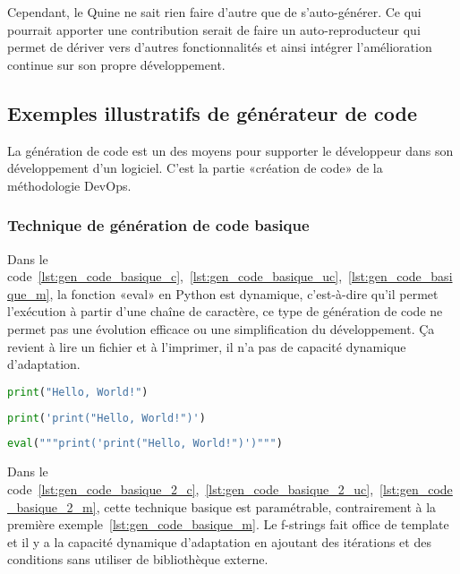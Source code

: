 Cependant, le Quine ne sait rien faire d’autre que de s’auto-générer. Ce qui pourrait apporter une contribution serait de faire un auto-reproducteur qui permet de dériver vers d’autres fonctionnalités et ainsi intégrer l’amélioration continue sur son propre développement.

\subsection{Exemples illustratifs de générateur de code}

La génération de code est un des moyens pour supporter le développeur dans son développement d’un logiciel. C’est la partie «création de code» de la méthodologie DevOps.

\subsubsection{Technique de génération de code basique}

Dans le code~\ref{lst:gen_code_basique_c},~\ref{lst:gen_code_basique_uc},~\ref{lst:gen_code_basique_m}, la fonction «eval» en Python est dynamique, c'est-à-dire qu’il permet l’exécution à partir d’une chaîne de caractère, ce type de génération de code ne permet pas une évolution efficace ou une simplification du développement. Ça revient à lire un fichier et à l'imprimer, il n’a pas de capacité dynamique d’adaptation.

\begin{lstlisting}[language=Python, upquote=true, caption={C}, label={lst:gen_code_basique_c}]
print("Hello, World!")
\end{lstlisting}

\begin{lstlisting}[language=Python, upquote=true, caption={µ$_C$}, label={lst:gen_code_basique_uc}]
print('print("Hello, World!")')
\end{lstlisting}

\begin{lstlisting}[language=Python, upquote=true, caption={M(µ$_C$)}, label={lst:gen_code_basique_m}]
eval("""print('print("Hello, World!")')""")
\end{lstlisting}

Dans le code~\ref{lst:gen_code_basique_2_c},~\ref{lst:gen_code_basique_2_uc},~\ref{lst:gen_code_basique_2_m}, cette technique basique est paramétrable, contrairement à la première exemple~\ref{lst:gen_code_basique_m}. Le f-strings fait office de template et il y a la capacité dynamique d’adaptation en ajoutant des itérations et des conditions sans utiliser de bibliothèque externe.

